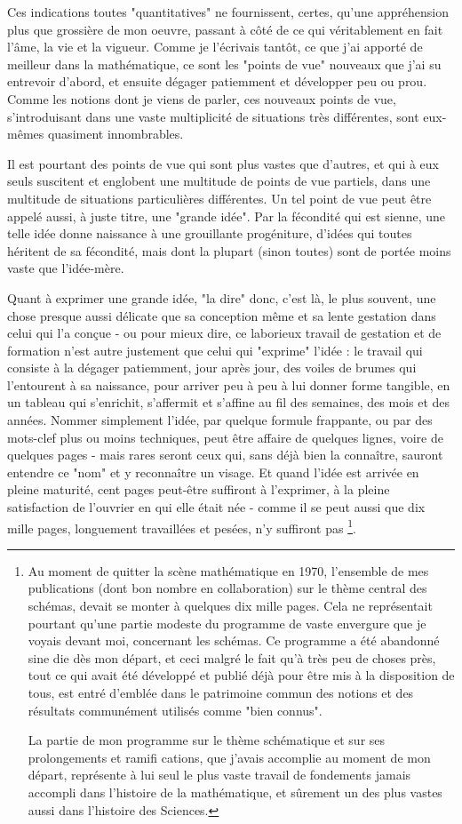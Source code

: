 Ces indications toutes "quantitatives" ne fournissent, certes, qu'une appréhension plus que grossière de mon oeuvre, passant à côté de ce qui véritablement en fait l'âme, la vie et la vigueur. Comme je l'écrivais tantôt, ce que j'ai apporté de meilleur dans la mathématique, ce sont les "points de vue" nouveaux que j'ai su entrevoir d'abord, et ensuite dégager patiemment et développer peu ou prou. Comme les notions dont je viens de parler, ces nouveaux points de vue, s'introduisant dans une vaste multiplicité de situations très différentes, sont eux-mêmes quasiment innombrables.

Il est pourtant des points de vue qui sont plus vastes que d'autres, et qui à eux seuls suscitent et englobent une multitude de points de vue partiels, dans une multitude de situations particulières différentes. Un tel point de vue peut être appelé aussi, à juste titre, une "grande idée". Par la fécondité qui est sienne, une telle idée donne naissance à une grouillante progéniture, d’idées qui toutes héritent de sa fécondité, mais dont la plupart (sinon toutes) sont de portée moins vaste que l'idée-mère.

Quant à exprimer une grande idée, "la dire" donc, c'est là, le plus souvent, une chose presque aussi délicate que sa conception même et sa lente gestation dans celui qui l'a conçue - ou pour mieux dire, ce laborieux travail de gestation et de formation n'est autre justement que celui qui "exprime" l'idée : le travail qui consiste à la dégager patiemment, jour après jour, des voiles de brumes qui l'entourent à sa naissance, pour arriver peu à peu à lui donner forme tangible, en un tableau qui s'enrichit, s'affermit et s'affine au fil des semaines, des mois et des années. Nommer simplement l'idée, par quelque formule frappante, ou par des mots-clef plus ou moins techniques, peut être affaire de quelques lignes, voire de quelques pages - mais rares seront ceux qui, sans déjà bien la connaître, sauront entendre ce "nom" et y reconnaître un visage. Et quand l'idée est arrivée en pleine maturité, cent pages peut-être suffiront à l'exprimer, à la pleine satisfaction de l'ouvrier en qui elle était née - comme il se peut aussi que dix mille pages, longuement travaillées et pesées, n'y suffiront pas \footnote{Au moment de quitter la scène mathématique en 1970, l'ensemble de mes publications (dont bon nombre en collaboration) sur le thème central des schémas, devait se monter à quelques dix mille pages. Cela ne représentait pourtant qu'une partie modeste du programme de vaste envergure que je voyais devant moi, concernant les schémas. Ce programme a été abandonné sine die dès mon départ, et ceci malgré le fait qu'à très peu de choses près, tout ce qui avait été développé et publié déjà pour être mis à la disposition de tous, est entré d'emblée dans le patrimoine commun des notions et des résultats communément utilisés comme "bien connus".

La partie de mon programme sur le thème schématique et sur ses prolongements et ramifi cations, que j'avais accomplie au moment de mon départ, représente à lui seul le plus vaste travail de fondements jamais accompli dans l'histoire de la mathématique, et sûrement un des plus vastes aussi dans l'histoire des Sciences.}.

